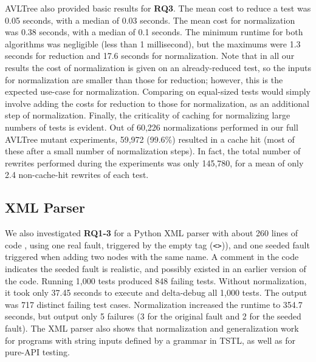 AVLTree also provided basic results for {\bf RQ3}. The mean cost to reduce a
test was 0.05 seconds, with a median of 0.03 seconds.  The mean
cost for normalization was 0.38 seconds, with a median of 0.1 seconds.
The minimum runtime for both algorithms was negligible (less than 1
millisecond), but the maximums were 1.3 seconds for reduction and 17.6
seconds for normalization.  Note that in all our results the cost of
normalization is given on an already-reduced test, so the inputs
for normalization are smaller than those for reduction; however, this
is the expected use-case for normalization.  Comparing on equal-sized
tests would simply involve adding the costs for reduction to those for
normalization, as an additional step of normalization.  Finally, the
criticality of caching for normalizing large numbers of tests is
evident.  Out of 60,226 normalizations performed in our full AVLTree mutant
experiments, 59,972 (99.6\%) resulted in a cache hit (most of these
after a small number of normalization steps).  In fact, the total
number of rewrites performed during the experiments was only 145,780,
for a mean of only 2.4 non-cache-hit rewrites of each test.

\subsection{XML Parser}

We also investigated {\bf RQ1-3} for a
Python XML parser with about 260 lines of code \cite{myxml}, using one
real fault, triggered by the empty tag ({\tt <>})), and one
seeded fault triggered when adding two nodes with the same
name.  A comment in the code indicates the seeded fault is realistic,
and possibly existed in an earlier version of the code.  Running 1,000 tests
produced 848 failing tests.  Without normalization, it took only
37.45 seconds to execute and delta-debug all 1,000 tests.  The output was 717 distinct failing test
cases.  Normalization increased the runtime to 354.7 seconds, but
output only 5 failures (3 for the original fault and 2 for the seeded
fault).  The XML parser also shows that normalization and generalization work for
programs with string inputs defined by a grammar in TSTL, as well
as for
pure-API testing.

